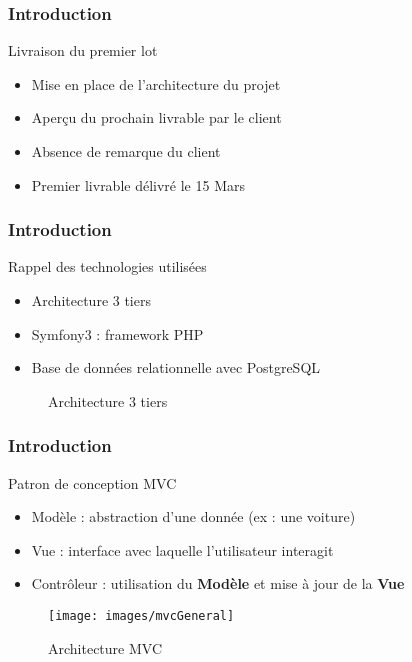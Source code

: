 
\speaker{\Kafui}
\begin{frame}
  \frametitle{Introduction}
  \begin{block}{Livraison du premier lot}
  \begin{itemize}
	\item Mise en place de l'architecture du projet
	\item Aperçu du prochain livrable par le client
	\item Absence de remarque du client
	\item Premier livrable délivré le 15 Mars
  \end{itemize}
  \end{block}
\end{frame}

\begin{frame}
  \frametitle{Introduction}
  \begin{block}{Rappel des technologies utilisées}
  \begin{itemize}
	\item Architecture 3 tiers
	\item Symfony3 : framework PHP 
	\item Base de données relationnelle avec PostgreSQL
  \end{itemize}

  \begin{figure}[!h]
	\begin{center}
	
	\caption{\label{3tiers_schema} Architecture 3 tiers}
	\end{center}
  \end{figure}
  \end{block}
\end{frame}

\begin{frame}
  \frametitle{Introduction}
  \begin{block}{Patron de conception MVC}
  \begin{itemize}
	\item Modèle : abstraction d'une donnée (ex : une voiture)
	\item Vue : interface avec laquelle l'utilisateur interagit
	\item Contrôleur : utilisation du \textbf{Modèle} et mise à jour de la \textbf{Vue}
	
  \end{itemize}

\begin{figure}[!h]
	\begin{center}
	\texttt{[image: images/mvcGeneral]}
	\caption{Architecture MVC}
	\end{center}
\end{figure}
\end{block}
\end{frame}

